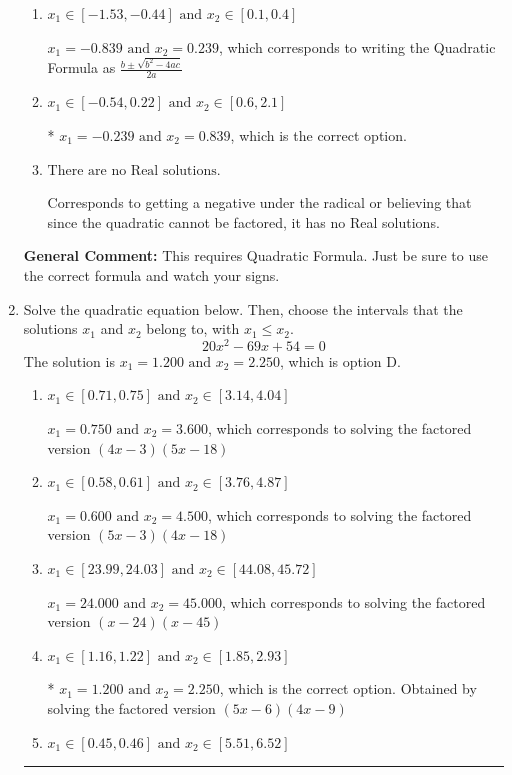 \documentclass{extbook}[14pt]
\newcommand{\litem}[1]{\item #1

\rule{\textwidth}{0.4pt}}
\begin{document}
\begin{enumerate}
{\begin{enumerate}[label=\Alph*.]
 $x_1 = -4.770 \text{ and } x_2 = 16.770$, which corresponds to using the Quadratic Formula with $a=1$
\item \( x_1 \in [-1.53, -0.44] \text{ and } x_2 \in [0.1, 0.4] \)

 $x_1 = -0.839 \text{ and } x_2 = 0.239$, which corresponds to writing the Quadratic Formula as $\frac{b \pm \sqrt{b^2 - 4ac}}{2a}$
\item \( x_1 \in [-0.54, 0.22] \text{ and } x_2 \in [0.6, 2.1] \)

* $x_1 = -0.239 \text{ and } x_2 = 0.839$, which is the correct option.
\item \( \text{There are no Real solutions.} \)

Corresponds to getting a negative under the radical or believing that since the quadratic cannot be factored, it has no Real solutions.
\end{enumerate}

\textbf{General Comment:} This requires Quadratic Formula. Just be sure to use the correct formula and watch your signs.
}
\litem{
Solve the quadratic equation below. Then, choose the intervals that the solutions $x_1$ and $x_2$ belong to, with $x_1 \leq x_2$.
\[ 20x^{2} -69 x + 54 = 0 \]The solution is \( x_1 = 1.200 \text{ and } x_2 = 2.250 \), which is option D.\begin{enumerate}[label=\Alph*.]
\item \( x_1 \in [0.71, 0.75] \text{ and } x_2 \in [3.14, 4.04] \)

$x_1 = 0.750 \text{ and } x_2 = 3.600$, which corresponds to solving the factored version $(4x -3)(5x -18)$
\item \( x_1 \in [0.58, 0.61] \text{ and } x_2 \in [3.76, 4.87] \)

$x_1 = 0.600 \text{ and } x_2 = 4.500$, which corresponds to solving the factored version $(5x -3)(4x -18)$
\item \( x_1 \in [23.99, 24.03] \text{ and } x_2 \in [44.08, 45.72] \)

$x_1 = 24.000 \text{ and } x_2 = 45.000$, which corresponds to solving the factored version $(x -24)(x -45)$
\item \( x_1 \in [1.16, 1.22] \text{ and } x_2 \in [1.85, 2.93] \)

* $x_1 = 1.200 \text{ and } x_2 = 2.250$, which is the correct option. Obtained by solving the factored version $(5x -6)(4x -9)$
\item \( x_1 \in [0.45, 0.46] \text{ and } x_2 \in [5.51, 6.52] \)


\end{enumerate}}
\end{enumerate}
\end{document}
